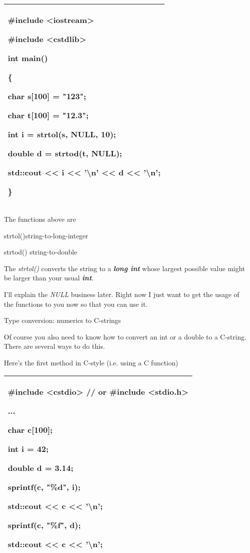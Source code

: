 \documentclass[
]{article}
\begin{document}
\begin{longtable}[]{@{}l@{}}
\toprule
\endhead
\begin{minipage}[t]{0.97\columnwidth}\raggedright
\#include \textless iostream\textgreater{}

\#include \textless cstdlib\textgreater{}

int main()

\{

char s{[}100{]} = "123";

char t{[}100{]} = "12.3";

int i = strtol(s, NULL, 10);

double d = strtod(t, NULL);

std::cout \textless\textless{} i \textless\textless{} '\textbackslash n'
\textless\textless{} d \textless\textless{} '\textbackslash n';

\}\strut
\end{minipage}\tabularnewline
\bottomrule
\end{longtable}

The functions above are

strtol()string-to-long-integer

strtod() string-to-double

The \emph{strtol()} converts the string to a \emph{\textbf{long int}}
whose largest possible value might be larger than your usual
\emph{\textbf{int}}.

I'll explain the \emph{NULL} business later. Right now I just want to
get the usage of the functions to you now so that you can use it.

Type conversion: numerics to C-strings

Of course you also need to know how to convert an int or a double to a
C-string. There are several ways to do this.

Here's the first method in C-style (i.e. using a C function)

\begin{longtable}[]{@{}l@{}}
\toprule
\endhead
\begin{minipage}[t]{0.97\columnwidth}\raggedright
\#include \textless cstdio\textgreater{} // or \#include
\textless stdio.h\textgreater{}

...

char c{[}100{]};

int i = 42;

double d = 3.14;

\textbf{sprintf(c, "\%d", i);}

std::cout \textless\textless{} c \textless\textless{}
'\textbackslash n';

\textbf{sprintf(c, "\%f", d);}

std::cout \textless\textless{} c \textless\textless{}
'\textbackslash n';\strut
\end{minipage}\tabularnewline
\bottomrule
\end{longtable}
\end{document}
